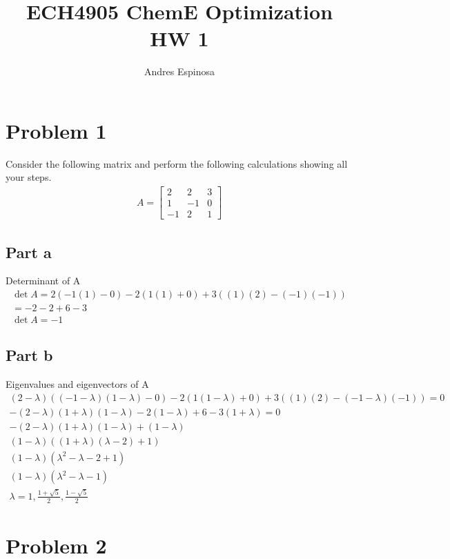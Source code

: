 \documentclass[11pt]{article}
\title{ECH4905 ChemE Optimization HW 1}
\author{Andres Espinosa}
\begin{document}
\maketitle

\section{Problem 1}
Consider the following matrix and perform the following calculations showing all your steps.
\begin{align*}
    A = 
  \begin{bmatrix}
     2 & 2 & 3 \\
     1 & -1 &0 \\
     -1 & 2 &1
  \end{bmatrix}
\end{align*}
\subsection{Part a}
Determinant of A
\begin{gather*}
    \det A = 
    2 (-1(1) - 0) - 2(1(1) + 0) + 3((1)(2) - (-1)(-1)) \\
    = -2 -2 + 6 - 3 \\
    \det A = -1
\end{gather*}

\subsection{Part b}
Eigenvalues and eigenvectors of A
\begin{gather*}
    (2- \lambda) ((-1 - \lambda)(1 - \lambda) - 0) - 2(1(1- \lambda) + 0) + 3((1)(2) - (-1-\lambda)(-1)) = 0 \\
    -(2-\lambda)(1+\lambda)(1-\lambda) -2(1-\lambda) + 6 -3(1+\lambda) = 0 \\
    -(2-\lambda)(1+\lambda)(1-\lambda) + (1-\lambda) \\
    (1-\lambda)((1+\lambda)(\lambda-2)+1) \\
    (1-\lambda)(\lambda^2 - \lambda -2 +1) \\
    (1-\lambda)(\lambda^2 - \lambda -1) \\
    \lambda = 1, \frac{1+\sqrt{5}}{2}, \frac{1 - \sqrt{5}}{2}
\end{gather*}


\section{Problem 2}
\end{document}
